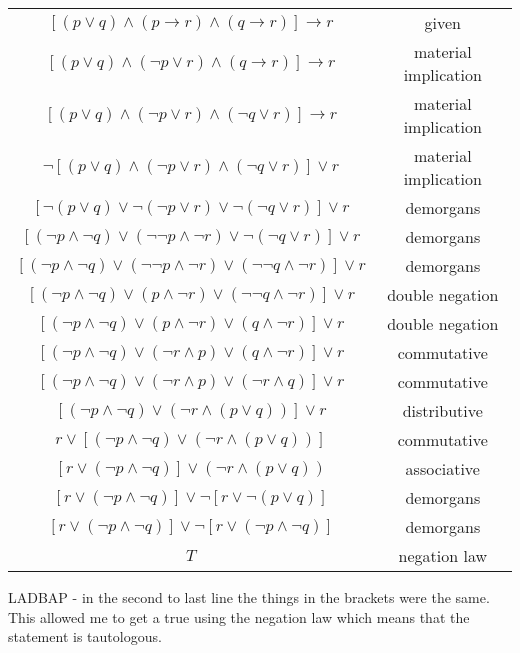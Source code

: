 \documentclass[h]{article}
\begin{document}
\begin{tabular}{|c c|}\hline
$[(p \vee q) \wedge (p \rightarrow r) \wedge (q \rightarrow r)] \rightarrow r$ & given \\
$[(p \vee q) \wedge (\neg p \vee r) \wedge (q \rightarrow r)] \rightarrow r$ & material implication \\
$[(p \vee q) \wedge (\neg p \vee r) \wedge (\neg q \vee r)] \rightarrow r$ & material implication \\
$\neg [(p \vee q) \wedge (\neg p \vee r) \wedge (\neg q \vee r)] \vee r$ & material implication \\
$[\neg (p \vee q) \vee \neg (\neg p \vee r) \vee \neg (\neg q \vee r)] \vee r$ & demorgans \\
$[ (\neg p \wedge \neg q) \vee  (\neg\neg p \wedge \neg r) \vee \neg (\neg q \vee r)] \vee r$ & demorgans \\
$[ (\neg p \wedge \neg q) \vee  (\neg\neg p \wedge \neg r) \vee  (\neg \neg q \wedge \neg r)] \vee r$ & demorgans \\
$[ (\neg p \wedge \neg q) \vee  (p \wedge \neg r) \vee  (\neg \neg q \wedge \neg r)] \vee r$ & double negation \\
$[ (\neg p \wedge \neg q) \vee  (p \wedge \neg r) \vee  (q \wedge \neg r)] \vee r$ & double negation \\
$[ (\neg p \wedge \neg q) \vee  (\neg r \wedge p) \vee  (q \wedge \neg r)] \vee r$ & commutative \\
$ [(\neg p \wedge \neg q) \vee  (\neg r \wedge p) \vee  (\neg r \wedge q) ]\vee r$ & commutative \\
$ [(\neg p \wedge \neg q) \vee  (\neg r \wedge(p \vee q))] \vee r$ & distributive \\
$ r \vee [(\neg p \wedge \neg q) \vee (\neg r \wedge(p \vee q))]$ & commutative \\
$ [r \vee (\neg p \wedge \neg q)] \vee (\neg r \wedge(p \vee q))$ & associative \\
$ [r \vee (\neg p \wedge \neg q)] \vee \neg [r \vee \neg(p \vee q)]$ & demorgans  \\
$ [r \vee (\neg p \wedge \neg q)] \vee \neg[ r \vee (\neg p \wedge \neg q)]$ & demorgans \\
$ T $ & negation law \\\hline
\end{tabular}\newline
LADBAP - in the second to last line the things  in the brackets were the same. This allowed me to get a true using the negation law which means that the statement is tautologous.
\end{document}
